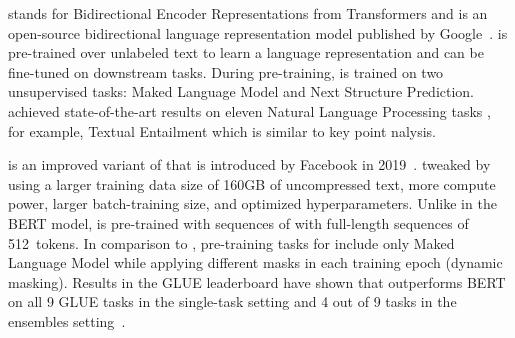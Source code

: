 \Bert stands for Bidirectional Encoder Representations from Transformers and is an open-source bidirectional language representation model published by Google~\cite{DevlinCLT2019}. 
\Bert is pre-trained over unlabeled text to learn a language representation and can be fine-tuned on downstream tasks. During pre-training, \Bert is trained on two unsupervised tasks: Maked Language Model and Next Structure Prediction. \Bert achieved state-of-the-art results on eleven Natural Language Processing tasks \cite{WangSMHLB2018}, for example, Textual Entailment which is similar to key point nalysis.

\Roberta is an improved variant of \Bert that is introduced by Facebook in 2019~\cite{LiuOGDJCLLZS2019}. \citet{LiuOGDJCLLZS2019} tweaked \Bert by using a larger training data size of 160GB of uncompressed text, more compute power, larger batch-training size, and optimized hyperparameters. Unlike in the BERT model, \Roberta is pre-trained with sequences of with full-length sequences of 512~tokens. In comparison to \Bert, pre-training tasks for \Roberta include only Maked Language Model while applying different masks in each training epoch (dynamic masking). Results in the GLUE leaderboard have shown that \Roberta outperforms BERT on all 9 GLUE tasks in the single-task setting and 4 out of 9 tasks in the ensembles setting~\cite{WangSMHLB2018,LiuOGDJCLLZS2019}.


